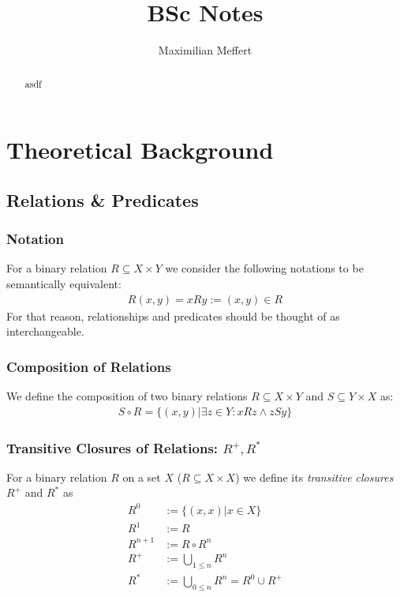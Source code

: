 \documentclass[runningheads,a4paper]{llncs}
\title{BSc Notes}
\author{Maximilian Meffert}
\begin{document}
\maketitle

\begin{abstract}
asdf
\end{abstract}


\section{Theoretical Background}

\subsection{Relations \& Predicates}

\subsubsection{Notation}
For a binary relation $R \subseteq X \times Y$ we consider the following notations to be semantically equivalent:
\begin{align*}
R(x,y)
= xRy
:= (x,y) \in R
\end{align*}
For that reason, relationships and predicates should be thought of as interchangeable. 


\subsubsection{Composition of Relations}
We define the composition of two binary relations $R \subseteq X \times Y$ and $S \subseteq Y \times X$ as:
\begin{align*}
S \circ R = \{ (x,y) | \exists z \in Y : xRz \wedge zSy \}
\end{align*}

\subsubsection{Transitive Closures of Relations: $R^+, R^*$}
For a binary relation $R$ on a set $X$ ($R \subseteq X \times X$) we define its \textit{transitive closures} $R^+$ and $R^*$ as
\begin{align*}
R^0 &:= \{ (x,x) | x \in X \} \\
R^1 &:= R \\
R^{n+1} &:= R \circ R^n \\
R^+ &:= \bigcup\limits_{1 \leq n} R^n \\
R^* &:= \bigcup\limits_{0 \leq n} R^n = R^0 \cup R^+
\end{align*}
\end{document}
